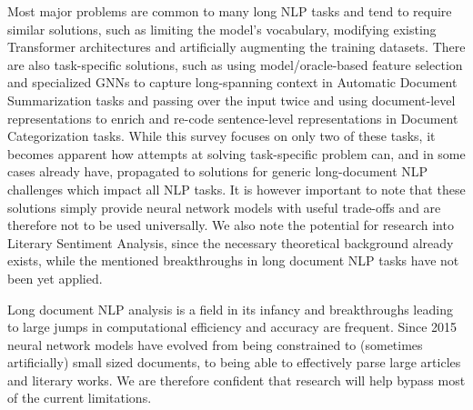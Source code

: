 \documentclass[preprint,review,12pt]{elsarticle}
\begin{document}
    Most major problems are common to many long NLP tasks and tend to require similar solutions, such as limiting the model's vocabulary, modifying existing Transformer architectures and artificially augmenting the training datasets. There are also task-specific solutions, such as using model/oracle-based feature selection and specialized GNNs to capture long-spanning context in Automatic Document Summarization tasks and passing over the input twice and using document-level representations to enrich and re-code sentence-level representations in Document Categorization tasks. While this survey focuses on only two of these tasks, it becomes apparent how attempts at solving task-specific problem can, and in some cases already have, propagated to solutions for generic long-document NLP challenges which impact all NLP tasks. It is however important to note that these solutions simply provide neural network models with useful trade-offs and are therefore not to be used universally. We also note the potential for research into Literary Sentiment Analysis, since the necessary theoretical background already exists, while the mentioned breakthroughs in long document NLP tasks have not been yet applied. 
    
    Long document NLP analysis is a field in its infancy and breakthroughs leading to large jumps in computational efficiency and accuracy are frequent. Since 2015 neural network models have evolved from being constrained to (sometimes artificially) small sized documents, to being able to effectively parse large articles and literary works. We are therefore confident that research will help bypass most of the current limitations. 
	
	
 

\end{document}

